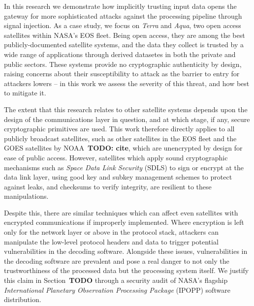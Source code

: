 In this research we demonstrate how implicitly trusting input data opens the gateway for more sophisticated attacks against the processing pipeline through signal injection.
As a case study, we focus on \textit{Terra} and \textit{Aqua}, two open access satellites within NASA's EOS fleet.
Being open access, they are among the best publicly-documented satellite systems, and the data they collect is trusted by a wide range of applications through derived datasetes in both the private and public sectors.
These systems provide no cryptographic authenticity by design, raising concerns about their susceptibility to attack as the barrier to entry for attackers lowers -- in this work we assess the severity of this threat, and how best to mitigate it.

The extent that this research relates to other satellite systems depends upon the design of the communications layer in question, and at which stage, if any, secure cryptographic primitives are used.
This work therefore directly applies to all publicly broadcast satellites, such as other satellites in the EOS fleet and the GOES satellites by NOAA~\textbf{TODO: cite}, which are unencrypted by design for ease of public access. %
However, satellites which apply sound cryptographic mechanisms such as \textit{Space Data Link Security} (SDLS) to sign or encrypt at the data link layer, using good key and subkey management schemes to protect against leaks, and checksums to verify integrity, are resilient to these manipulations.



Despite this, there are similar techniques which can affect even satellites with encrypted communications if improperly implemented.
Where encryption is left only for the network layer or above in the protocol stack, attackers can manipulate the low-level protocol headers and data to trigger potential vulnerabilities in the decoding software.
Alongside these issues, vulnerabilities in the decoding software are prevalent and pose a real danger to not only the trustworthiness of the processed data but the processing system itself.
We justify this claim in Section~\textbf{TODO} through a security audit of NASA's flagship \textit{International Planetary Observation Processing Package} (IPOPP) software distribution.

